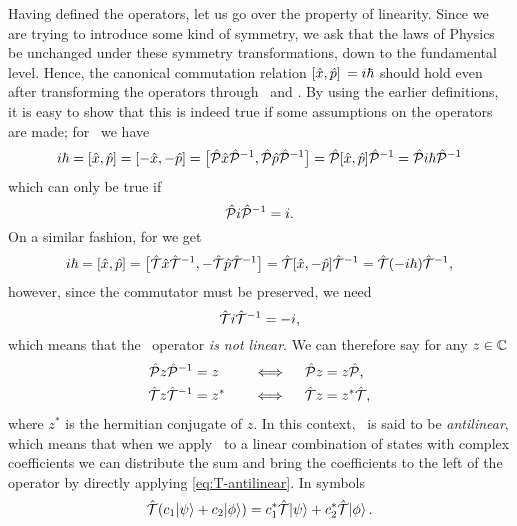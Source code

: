         Having defined the operators, let us go over the property of linearity. Since we are trying to introduce some kind of symmetry, we ask that the laws of Physics be unchanged under these symmetry transformations, down to the fundamental level. Hence, the canonical commutation relation $\comm*{\hx}{\hp} = i \hbar$ should hold even after transforming the operators through \hP\ and \hT. By using the earlier definitions, it is easy to show that this is indeed true if some assumptions on the operators are made; for \hP\ we have
        \begin{align*}
            i \hbar 
            = \comm*{\hx}{\hp}\! 
            = \comm*{-\hx}{-\hp} \!
            = \bigl[\hP \hx \hP^{-1},\hP \hp \hP^{-1}\bigr] 
            = \hP \comm*{\hx}{\hp}\! \hP^{-1} 
            = \hP i \hbar \hP^{-1} 
        \end{align*}
        which can only be true if
        \begin{equation}
            \label{eq:PiP}
            \mathcal{\hat{P}} i \mathcal{\hat{P}}^{-1} = i
            \text{.}
        \end{equation}
        On a similar fashion, for \hT we get
        \begin{align*}
            i \hbar
            = \comm*{\hx}{\hp}\! 
            = \bigl[\hT \hx \hT^{-1},-\hT \hp \hT^{-1}\bigr] 
            = \hT \comm*{\hx}{-\hp}\! \hT^{-1}
            = \hT \pqty{-i \hbar} \hT^{-1}
            \mycomma
        \end{align*}
        however, since the commutator must be preserved, we need
        \begin{equation}
            \label{eq:TiT}
            \mathcal{\hat{T}} i \mathcal{\hat{T}}^{-1} = -i
            \text{,}
        \end{equation}
        which means that the \hT\ operator \emph{is not linear}. We can therefore say for any $z \in \mathbb{C}$ 
        \begin{alignat}{3}
            \label{eq:P-linear}
            \mathcal{\hat{P}} z \mathcal{\hat{P}}^{-1} &= z        
            &\quad\iff\quad 
            \mathcal{\hat{P}} z &= z \mathcal{\hat{P}}
            \text{,}
            \\
            \label{eq:T-antilinear}
            \mathcal{\hat{T}} z \mathcal{\hat{T}}^{-1} &= z^* 
            &\quad\iff\quad 
            \mathcal{\hat{T}} z &= z^* \mathcal{\hat{T}}
            \text{,}
        \end{alignat}
        where $z^*$ is the hermitian conjugate %
        of $z$. In this context, \hT\ is said to be \emph{antilinear}, which means that when we apply \hT\ to a linear combination of states with complex coefficients we can distribute the sum and bring the coefficients to the left of the operator by directly applying \eqref{eq:T-antilinear}. In symbols
        \begin{equation*}
            \hT\pqty{c_1\!\ket{\psi} + c_2\!\ket{\phi}}
            = c_1^* \hT\!\ket{\psi} + c_2^* \hT\!\ket{\phi}
            \myperiod
        \end{equation*}

